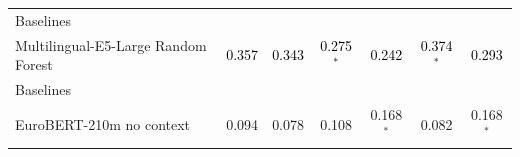 \begin{tabularx}{\textwidth}{X | c c c c c c}
Baselines\\\subcatarrow{}Multilingual-E5-Large Random Forest & \textcolor{Black}{0.357} & \textcolor{Black}{0.343} & \textcolor{Black}{0.275$^{*}$} & \textcolor{Black}{0.242} & \textcolor{Black}{0.374$^{*}$} & \textcolor{Black}{0.293} \\
Baselines\\\subcatarrow{}EuroBERT-210m no context & \textcolor{NavyBlue}{0.094} & \textcolor{NavyBlue}{0.078} & \textcolor{White!50!NavyBlue}{0.108} & \textcolor{White!50!NavyBlue}{0.168$^{*}$} & \textcolor{NavyBlue}{0.082} & \textcolor{White!50!NavyBlue}{0.168$^{*}$} \\
\hline
\end{tabularx}